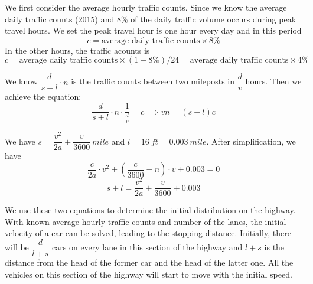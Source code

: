 \documentclass[a4paper]{article}
\begin{document}
	We first consider the average hourly traffic counts. Since we know the average daily traffic counts (2015) and 8\% of the daily traffic volume occurs during peak travel hours. We set the peak travel hour is one hour every day and in this period $$ c=\text{average daily traffic counts}\times 8\% $$ In the other hours, the traffic acounts is  $$ c=\text{average daily traffic counts}\times (1-8\%)/24=\text{average daily traffic counts}\times 4\%  $$

	We know $ \dfrac{d}{s+l}\cdot n $ is the traffic counts between two mileposts in $ \dfrac{d}{v} $ hours. Then we achieve the equation:
	$$ \dfrac{d}{s+l}\cdot n\cdot\frac{1}{\frac{d}{v}}=c\implies vn=(s+l)c $$

	We have $ s=\dfrac{v^2}{2a}+\dfrac{v}{3600}\ mile $ and $ l=16\ ft=0.003\ mile $. After simplification, we have
	$$ \dfrac{c}{2a}\cdot v^2+\left(\dfrac{c}{3600}-n\right)\cdot v+0.003=0 $$
	$$ s+l=\dfrac{v^2}{2a}+\dfrac{v}{3600}+0.003 $$

	We use these two equations to determine the initial distribution on the highway. With known average hourly traffic counts and number of the lanes, the initial velocity of a car can be solved, leading to the stopping distance. Initially, there will be $ \dfrac{d}{l+s} $ cars on every lane in this section of the highway and $ l+s $ is the distance from the head of the former car and the head of the latter one. All the vehicles on this section of the highway will start to move with the initial speed.
\end{document}
